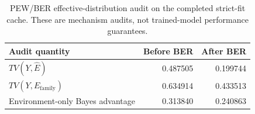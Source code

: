 \begin{table}[t]
\centering
\small
\caption{PEW/BER effective-distribution audit on the completed strict-fit cache. These are mechanism audits, not trained-model performance guarantees.}
\label{tab:pew-audit}
\begin{tabular}{lrr}
\toprule
Audit quantity & Before BER & After BER \\
\midrule
$TV(Y,\hat E)$ & 0.487505 & 0.199744 \\
$TV(Y,E_{\mathrm{family}})$ & 0.634914 & 0.433513 \\
Environment-only Bayes advantage & 0.313840 & 0.240863 \\
\bottomrule
\end{tabular}
\end{table}

